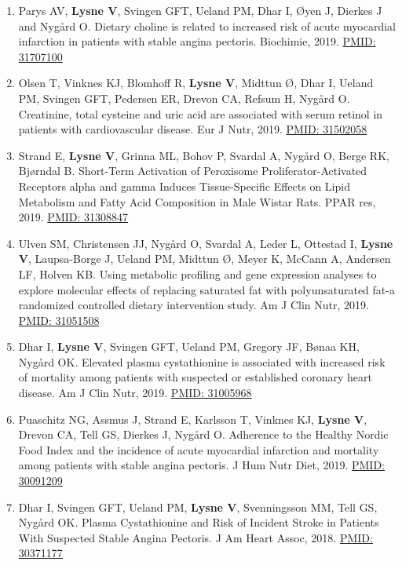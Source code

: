 \documentclass[11pt, a4paper]{awesome-cv}
\providecommand{\tightlist}{%
	\setlength{\itemsep}{0pt}\setlength{\parskip}{0pt}}
\begin{document}
\begin{enumerate}
\def\labelenumi{\arabic{enumi}.}
\tightlist
\item
  Parys AV, \textbf{Lysne V}, Svingen GFT, Ueland PM, Dhar I, Øyen J, Dierkes J and Nygård O. Dietary choline is related to increased risk of acute myocardial infarction in patients with stable angina pectoris. Biochimie, 2019. \href{https://www.ncbi.nlm.nih.gov/pubmed/31707100}{PMID: 31707100}
\item
  Olsen T, Vinknes KJ, Blomhoff R, \textbf{Lysne V}, Midttun Ø, Dhar I, Ueland PM, Svingen GFT, Pedersen ER, Drevon CA, Refsum H, Nygård O. Creatinine, total cysteine and uric acid are associated with serum retinol in patients with cardiovascular disease. Eur J Nutr, 2019. \href{https://www.ncbi.nlm.nih.gov/pubmed/31502058}{PMID: 31502058}
\item
  Strand E, \textbf{Lysne V}, Grinna ML, Bohov P, Svardal A, Nygård O, Berge RK, Bjørndal B. Short-Term Activation of Peroxisome Proliferator-Activated Receptors alpha and gamma Induces Tissue-Specific Effects on Lipid Metabolism and Fatty Acid Composition in Male Wistar Rats. PPAR res, 2019. \href{https://www.ncbi.nlm.nih.gov/pubmed/31308847}{PMID: 31308847}
\item
  Ulven SM, Christensen JJ, Nygård O, Svardal A, Leder L, Ottestad I, \textbf{Lysne V}, Laupsa-Borge J, Ueland PM, Midttun Ø, Meyer K, McCann A, Andersen LF, Holven KB. Using metabolic profiling and gene expression analyses to explore molecular effects of replacing saturated fat with polyunsaturated fat-a randomized controlled dietary intervention study. Am J Clin Nutr, 2019. \href{https://www.ncbi.nlm.nih.gov/pubmed/31051508}{PMID: 31051508}
\item
  Dhar I, \textbf{Lysne V}, Svingen GFT, Ueland PM, Gregory JF, Bønaa KH, Nygård OK. Elevated plasma cystathionine is associated with increased risk of mortality among patients with suspected or established coronary heart disease. Am J Clin Nutr, 2019. \href{https://www.ncbi.nlm.nih.gov/pubmed/31005968}{PMID: 31005968}
\item
  Puaschitz NG, Assmus J, Strand E, Karlsson T, Vinknes KJ, \textbf{Lysne V}, Drevon CA, Tell GS, Dierkes J, Nygård O. Adherence to the Healthy Nordic Food Index and the incidence of acute myocardial infarction and mortality among patients with stable angina pectoris. J Hum Nutr Diet, 2019. \href{https://www.ncbi.nlm.nih.gov/pubmed/30091209}{PMID: 30091209}
\item
  Dhar I, Svingen GFT, Ueland PM, \textbf{Lysne V}, Svenningsson MM, Tell GS, Nygård OK. Plasma Cystathionine and Risk of Incident Stroke in Patients With Suspected Stable Angina Pectoris. J Am Heart Assoc, 2018. \href{https://www.ncbi.nlm.nih.gov/pubmed/30371177}{PMID: 30371177}

\end{enumerate}
\end{document}
